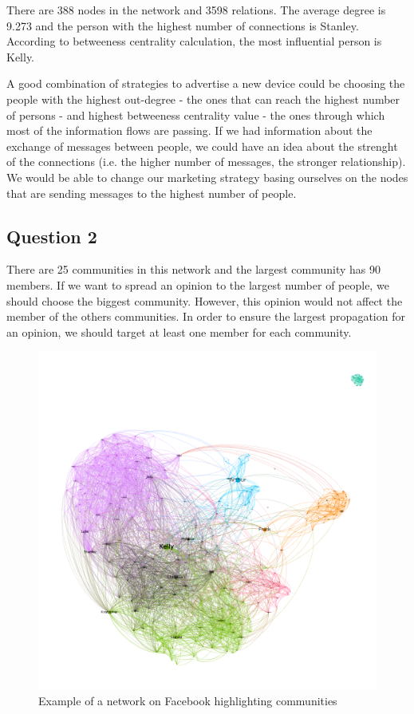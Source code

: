 \documentclass[a4paper]{article}
\begin{document}
There are 388 nodes in the network and 3598 relations. The average degree is 9.273 and the person with the highest number of connections is Stanley. According to betweeness centrality calculation, the most influential person is Kelly. 

A good combination of strategies to advertise a new device could be choosing the people with the highest out-degree - the ones that can reach the highest number of persons - and highest betweeness centrality value - the ones through which most of the information flows are passing. If we had information about the exchange of messages between people, we could have an idea about the strenght of the connections (i.e. the higher number of messages, the stronger relationship). We would be able to change our marketing strategy basing ourselves on the nodes that are sending messages to the highest number of people.

\subsection{Question 2}

There are 25 communities in this network and the largest community has 90 members. If we want to spread an opinion to the largest number of people, we should choose the biggest community. However, this opinion would not affect the member of the others communities. In order to ensure the largest propagation for an opinion, we should target at least one member for each community.

\begin{figure}[!htpb]
\centering
\includegraphics[width=\textwidth]{res/img/facebook}
\caption{Example of a network on Facebook highlighting communities}
\label{fig:facebook}
\end{figure}
\end{document}
